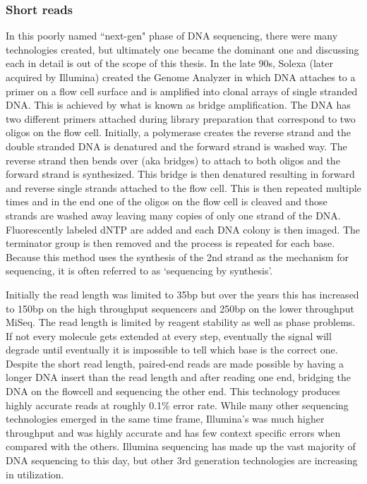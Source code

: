 \subsubsection{Short reads}\label{section:nextgen}

\par{
In this poorly named ``next-gen" phase of DNA sequencing, there were many technologies created, but ultimately one became the dominant one and discussing each in detail is out of the scope of this thesis. In the late 90s, Solexa (later acquired by Illumina) created the Genome Analyzer in which DNA attaches to a primer on a flow cell surface and is amplified into clonal arrays of single stranded DNA\cite{flowcell}. This is achieved by what is known as bridge amplification. The DNA has two different primers attached during library preparation that correspond to two oligos on the flow cell. Initially, a polymerase creates the reverse strand and the double stranded DNA is denatured and the forward strand is washed way. The reverse strand then bends over (aka bridges) to attach to both oligos and the forward strand is synthesized. This bridge is then denatured resulting in forward and reverse single strands attached to the flow cell. This is then repeated multiple times and in the end one of the oligos on the flow cell is cleaved and those strands are washed away leaving many copies of only one strand of the DNA\cite{bridgeamp}. Fluorescently labeled dNTP are added and each DNA colony is then imaged. The terminator group is then removed\cite{reversibleterminator} and the process is repeated for each base. Because this method uses the synthesis of the 2nd strand as the mechanism for sequencing, it is often referred to as `sequencing by synthesis'. 
} \\

\par{
Initially the read length was limited to 35bp but over the years this has increased to 150bp on the high throughput sequencers and 250bp on the lower throughput MiSeq. The read length is limited by reagent stability as well as phase problems. If not every molecule gets extended at every step, eventually the signal will degrade until eventually it is impossible to tell which base is the correct one. Despite the short read length, paired-end reads are made possible by having a longer DNA insert than the read length and after reading one end, bridging the DNA on the flowcell and sequencing the other end. This technology produces highly accurate reads at roughly 0.1\% error rate. While many other sequencing technologies emerged in the same time frame, Illumina's was much higher throughput and was highly accurate and has few context specific errors when compared with the others\cite{errormotifs}. Illumina sequencing has made up the vast majority of DNA sequencing to this day, but other 3rd generation technologies are increasing in utilization.
}


